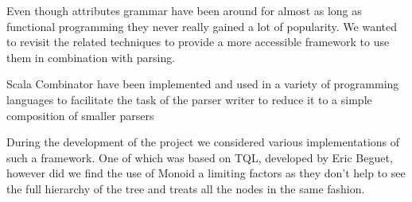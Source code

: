 Even though attributes grammar have been around for almost as long as functional programming they never really gained a lot of popularity. We wanted to revisit the related techniques to provide a more accessible framework to use them in combination with parsing.

Scala Combinator have been implemented and used in a variety of programming languages to facilitate the task of the parser writer to reduce it to a simple composition of smaller parsers

During the development of the project we considered various implementations of such a framework. One of which was based on TQL, developed by Eric Beguet, however did we find the use of Monoid a limiting factors as they don't help to see the full hierarchy of the tree and treats all the nodes in the same fashion.
